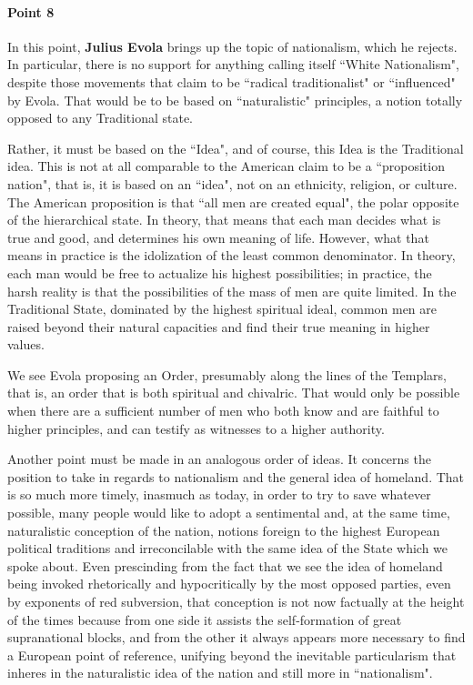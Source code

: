 \paragraph{Point 8}
\begin{quotex}
In this point, \textbf{Julius Evola} brings up the topic of nationalism, which he rejects. In particular, there is no support for anything calling itself ``White Nationalism", despite those movements that claim to be ``radical traditionalist" or ``influenced" by Evola. That would be to be based on ``naturalistic" principles, a notion totally opposed to any Traditional state.

Rather, it must be based on the ``Idea", and of course, this Idea is the Traditional idea. This is not at all comparable to the American claim to be a ``proposition nation", that is, it is based on an ``idea", not on an ethnicity, religion, or culture. The American proposition is that ``all men are created equal", the polar opposite of the hierarchical state. In theory, that means that each man decides what is true and good, and determines his own meaning of life. However, what that means in practice is the idolization of the least common denominator. In theory, each man would be free to actualize his highest possibilities; in practice, the harsh reality is that the possibilities of the mass of men are quite limited. In the Traditional State, dominated by the highest spiritual ideal, common men are raised beyond their natural capacities and find their true meaning in higher values.

We see Evola proposing an Order, presumably along the lines of the Templars, that is, an order that is both spiritual and chivalric. That would only be possible when there are a sufficient number of men who both know and are faithful to higher principles, and can testify as witnesses to a higher authority. 

\end{quotex}
Another point must be made in an analogous order of ideas. It concerns the position to take in regards to nationalism and the general idea of homeland. That is so much more timely, inasmuch as today, in order to try to save whatever possible, many people would like to adopt a sentimental and, at the same time, naturalistic conception of the nation, notions foreign to the highest European political traditions and irreconcilable with the same idea of the State which we spoke about. Even prescinding from the fact that we see the idea of homeland being invoked rhetorically and hypocritically by the most opposed parties, even by exponents of red subversion, that conception is not now factually at the height of the times because from one side it assists the self-formation of great supranational blocks, and from the other it always appears more necessary to find a European point of reference, unifying beyond the inevitable particularism that inheres in the naturalistic idea of the nation and still more in ``nationalism".

